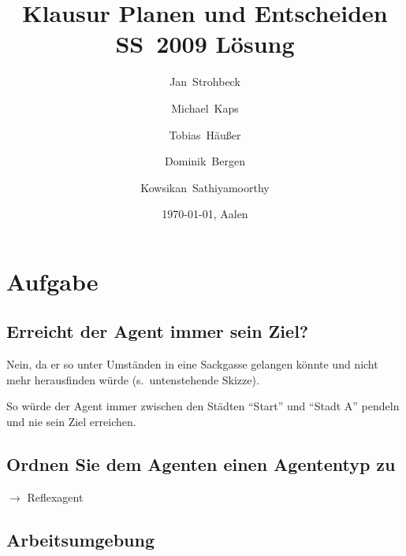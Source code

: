 \documentclass[a4paper,draft=false,oneside,12pt,ngerman]{scrreprt}
\title{Klausur Planen und Entscheiden SS~2009 Lösung}
\author{Jan~Strohbeck \and Michael~Kaps \and Tobias~Häußer \and Dominik~Bergen \and Kowsikan~Sathiyamoorthy}
\date{\today{}, Aalen}
\begin{document}
\pagestyle{empty}
\renewcommand*{\chapterpagestyle}{scrheadings}


\cleardoublepage{}
\renewcommand*{\chapterpagestyle}{scrheadings}
\pagestyle{scrheadings}


\chapter{Aufgabe}
\label{chp:aufgabe1}

\section{Erreicht der Agent immer sein Ziel?}
\label{sec:erreicht_der_agent_immer_sein_ziel?}

Nein, da er so unter Umständen in eine Sackgasse gelangen könnte und nicht mehr
herausfinden würde (s.\ untenstehende Skizze).

\begin{center}
\vspace{0.4cm}
\end{center}

So würde der Agent immer zwischen den Städten \enquote{Start} und \enquote{Stadt
A} pendeln und nie sein Ziel erreichen.

\section{Ordnen Sie dem Agenten einen Agententyp zu}
\label{sec:ordnen_sie_dem_agenten_einen_agententyp_zu}

$\rightarrow$ Reflexagent

\section{Arbeitsumgebung}
\label{sec:arbeitsumgebung}
\end{document}
